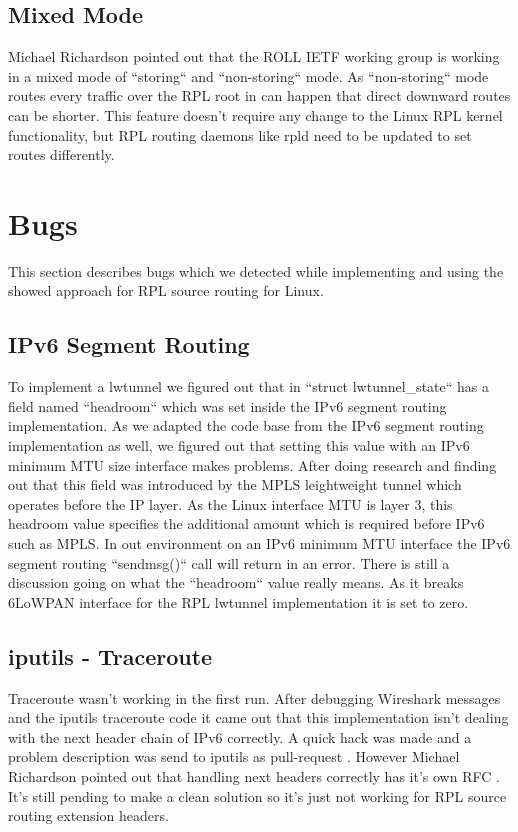 \documentclass[letterpaper]{article}
\begin{document}
\subsection{Mixed Mode}

Michael Richardson pointed out that the ROLL IETF working group is working in a mixed mode of ``storing`` and ``non-storing`` mode.
As ``non-storing`` mode routes every traffic over the RPL root in can happen that direct downward routes can be shorter.
This feature doesn't require any change to the Linux RPL kernel functionality, but RPL routing daemons like rpld need to be updated to set routes differently.

\section{Bugs}

This section describes bugs which we detected while implementing and using the showed approach for RPL source routing for Linux.

\subsection{IPv6 Segment Routing}

To implement a lwtunnel we figured out that in ``struct lwtunnel\_state`` has a field named ``headroom`` which was set inside the IPv6 segment routing implementation.
As we adapted the code base from the IPv6 segment routing implementation as well, we figured out that setting this value with an IPv6 minimum MTU size interface makes problems.
After doing research and finding out that this field was introduced by the MPLS leightweight tunnel which operates before the IP layer.
As the Linux interface MTU is layer 3, this headroom value specifies the additional amount which is required before IPv6 such as MPLS.
In out environment on an IPv6 minimum MTU interface the IPv6 segment routing ``sendmsg()`` call will return in an error.
There is still a discussion going on what the ``headroom`` value really means. As it breaks 6LoWPAN interface for the RPL lwtunnel implementation it is set to zero.

\subsection{iputils - Traceroute}

Traceroute wasn't working in the first run.
After debugging Wireshark messages and the iputils traceroute code it came out that this implementation isn't dealing with the next header chain of IPv6 correctly.
A quick hack was made and a problem description was send to iputils as pull-request \cite{iputilspr}. However Michael Richardson pointed out that handling next headers correctly has it's own RFC \cite{RFC7045}.
It's still pending to make a clean solution so it's just not working for RPL source routing extension headers.



\end{document}
